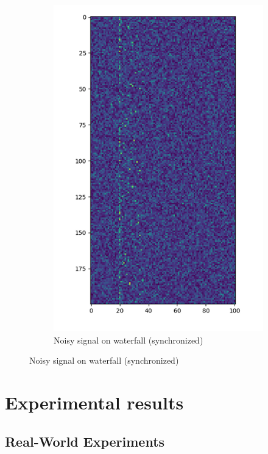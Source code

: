 \documentclass[a4paper]{article}
\begin{document}
\begin{figure}[H]
\begin{subfigure}[b]{0.45\textwidth}
        \includegraphics[width=1\textwidth]{waterfall_sync_noisy.png}
        \caption{\label{fig:dft_noisy}Noisy signal on waterfall (synchronized)}
    \end{subfigure}
\end{figure}

\section{Experimental results}

\subsection{Real-World Experiments}
\end{document}
